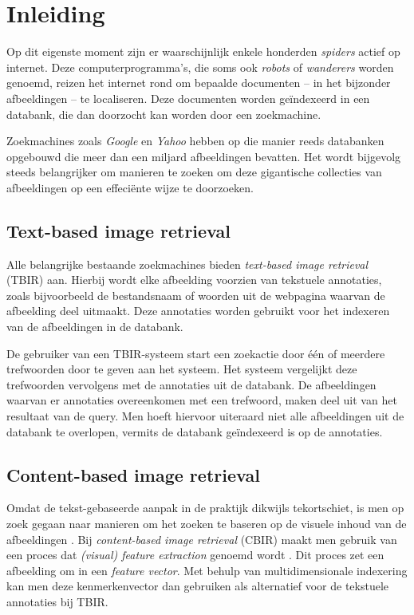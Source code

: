 \chapter{Inleiding}

Op dit eigenste moment zijn er waarschijnlijk enkele honderden \emph{spiders} actief op internet.
Deze computerprogramma's, die soms ook \emph{robots} of \emph{wanderers} worden genoemd, reizen
het internet rond om bepaalde documenten -- in het bijzonder afbeeldingen -- te localiseren. Deze 
documenten worden ge\"indexeerd in een databank, die dan doorzocht kan worden door een zoekmachine. 

Zoekmachines zoals \emph{Google} en \emph{Yahoo} hebben op die manier reeds databanken
opgebouwd die meer dan een miljard afbeeldingen bevatten. Het wordt bijgevolg steeds belangrijker
om manieren te zoeken om deze gigantische collecties van afbeeldingen op een effeci\"ente wijze
te doorzoeken.


\section{Text-based image retrieval}

Alle belangrijke bestaande zoekmachines bieden \emph{text-based image retrieval} (TBIR) aan. 
Hierbij wordt elke afbeelding voorzien van tekstuele annotaties, zoals bijvoorbeeld de 
bestandsnaam of woorden uit de webpagina waarvan de afbeelding deel uitmaakt. Deze annotaties
worden gebruikt voor het indexeren van de afbeeldingen in de databank.

De gebruiker van een TBIR-systeem start een zoekactie door \'e\'en of meerdere trefwoorden door te geven
aan het systeem. Het systeem vergelijkt deze trefwoorden vervolgens met de annotaties uit
de databank. De afbeeldingen waarvan er annotaties overeenkomen met een trefwoord, maken
deel uit van het resultaat van de query. Men hoeft hiervoor uiteraard niet alle afbeeldingen
uit de databank te overlopen, vermits de databank ge\"indexeerd is op de annotaties. 

\section{Content-based image retrieval}

Omdat de tekst-gebaseerde aanpak in de praktijk dikwijls tekortschiet, is men op zoek gegaan 
naar manieren om het zoeken te baseren op de visuele inhoud van de afbeeldingen 
\cite{veltcamp:cbirs}. Bij \emph{content-based image retrieval} (CBIR) maakt men gebruik van een proces dat 
\emph{(visual) feature extraction} genoemd wordt \cite{rui:image_retr}. Dit proces zet een afbeelding om in een 
\emph{feature vector}. Met behulp van multidimensionale indexering kan men deze kenmerkenvector
dan gebruiken als alternatief voor de tekstuele annotaties bij TBIR.


